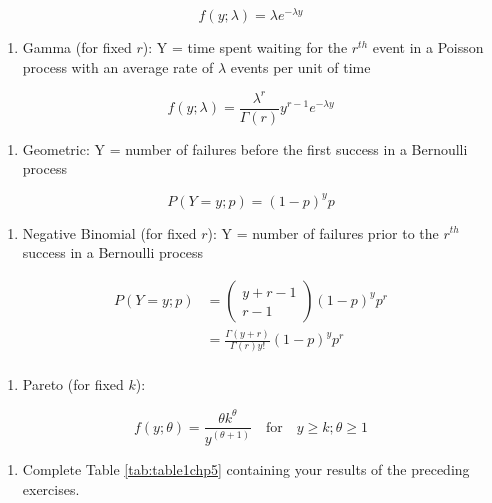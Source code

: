 \documentclass[
]{krantz}
\providecommand{\tightlist}{%
  \setlength{\itemsep}{0pt}\setlength{\parskip}{0pt}}
\begin{document}
\[f(y; \lambda)=\lambda e^{-\lambda y}\]

\begin{enumerate}
\def\labelenumi{\alph{enumi})}
\setcounter{enumi}{6}
\tightlist
\item
  Gamma (for fixed \(r\)): Y = time spent waiting for the \(r^{th}\) event in a Poisson process with an average rate of \(\lambda\) events per unit of time
\end{enumerate}

\[f(y; \lambda) = \frac{\lambda^r}{\Gamma(r)} y^{r-1} e^{-\lambda y}\]

\begin{enumerate}
\def\labelenumi{\alph{enumi})}
\setcounter{enumi}{7}
\tightlist
\item
  Geometric: Y = number of failures before the first success in a Bernoulli process
\end{enumerate}

\[P(Y=y;p)=(1-p)^{y}p\]

\begin{enumerate}
\def\labelenumi{\roman{enumi})}
\tightlist
\item
  Negative Binomial (for fixed \(r\)): Y = number of failures prior to the \(r^{th}\) success in a Bernoulli process
\end{enumerate}

\begin{align*}
P(Y=y; p) & =  \left(\begin{array} {c}  y+r-1\\r-1  \end{array}\right)(1-p)^{y}p^r \nonumber \\
 & =  \frac{\Gamma(y+r)}{\Gamma(r)y!} (1-p)^{y}p^r  \\
\end{align*}

\begin{enumerate}
\def\labelenumi{\alph{enumi})}
\setcounter{enumi}{9}
\tightlist
\item
  Pareto (for fixed \(k\)):
\end{enumerate}

\[f(y; \theta)=\frac{\theta k^\theta}{y^{(\theta+1)}}\quad \textrm{for}\quad y\geq k; \theta \geq 1\]

\begin{enumerate}
\def\labelenumi{\arabic{enumi}.}
\setcounter{enumi}{1}
\tightlist
\item
  Complete Table \ref{tab:table1chp5} containing your results of the preceding exercises.
\end{enumerate}
\end{document}
